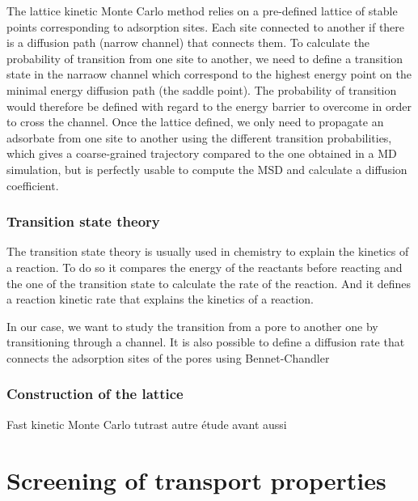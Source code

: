 \documentclass[main]{subfiles}
\begin{document}
The lattice kinetic Monte Carlo method relies on a pre-defined lattice of stable points corresponding to adsorption sites. Each site connected to another if there is a diffusion path (narrow channel) that connects them. To calculate the probability of transition from one site to another, we need to define a transition state in the narraow channel which correspond to the highest energy point on the minimal energy diffusion path (the saddle point). The probability of transition would therefore be defined with regard to the energy barrier to overcome in order to cross the channel. Once the lattice defined, we only need to propagate an adsorbate from one site to another using the different transition probabilities, which gives a coarse-grained trajectory compared to the one obtained in a MD simulation, but is perfectly usable to compute the MSD and calculate a diffusion coefficient.


\subsubsection{Transition state theory}

The transition state theory is usually used in chemistry to explain the kinetics of a reaction. To do so it compares the energy of the reactants before reacting and the one of the transition state to calculate the rate of the reaction. And it defines a reaction kinetic rate that explains the kinetics of a reaction.

In our case, we want to study the transition from a pore to another one by transitioning through a channel. It is also possible to define a diffusion rate that connects the adsorption sites of the pores using Bennet-Chandler 
\autocite{BENNETT1977}


\subsubsection{Construction of the lattice}


Fast kinetic Monte Carlo
tutrast\autocite{Mace_2019} autre étude avant aussi



\section{Screening of transport properties}\label{sct:md_screening}
\end{document}
